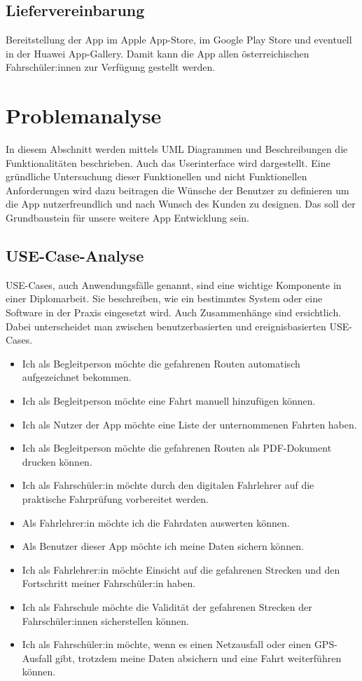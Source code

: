 \subsection{Liefervereinbarung}
Bereitstellung der App im Apple App-Store, im Google Play Store und eventuell in der Huawei App-Gallery. Damit kann die App allen österreichischen Fahrschüler:innen zur Verfügung gestellt werden.

\section{Problemanalyse}
\label{sec:problemanalyse}
In diesem Abschnitt werden mittels UML Diagrammen und Beschreibungen die Funktionalitäten beschrieben. Auch das Userinterface wird dargestellt. Eine gründliche Untersuchung dieser Funktionellen und nicht Funktionellen Anforderungen wird dazu beitragen die Wünsche der Benutzer zu definieren um die App nutzerfreundlich und nach Wunsch des Kunden zu designen. Das soll der Grundbaustein für unsere weitere App Entwicklung sein.

\subsection{USE-Case-Analyse}

USE-Cases, auch Anwendungsfälle genannt, sind eine wichtige Komponente in einer Diplomarbeit. Sie beschreiben, wie ein bestimmtes System oder eine Software in der Praxis eingesetzt wird. Auch Zusammenhänge sind ersichtlich. Dabei unterscheidet man zwischen benutzerbasierten und ereignisbasierten USE-Cases.

\begin{itemize}
	\item Ich als Begleitperson möchte die gefahrenen Routen automatisch aufgezeichnet bekommen.
	\item Ich als Begleitperson möchte eine Fahrt manuell hinzufügen können.
	\item Ich als Nutzer der App möchte eine Liste der unternommenen Fahrten haben.
	\item Ich als Begleitperson möchte die gefahrenen Routen als PDF-Dokument drucken können.
	\item Ich als Fahrschüler:in möchte durch den digitalen Fahrlehrer auf die praktische Fahrprüfung vorbereitet werden.
	\item Als Fahrlehrer:in möchte ich die Fahrdaten auswerten können.
	\item Als Benutzer dieser App möchte ich meine Daten sichern können.
	\item Ich als Fahrlehrer:in möchte Einsicht auf die gefahrenen Strecken und den Fortschritt meiner Fahrschüler:in haben.
	\item Ich als Fahrschule möchte die Validität der gefahrenen Strecken der Fahrschüler:innen sicherstellen können.
	\item Ich als Fahrschüler:in möchte, wenn es einen Netzausfall oder einen GPS-Ausfall gibt, trotzdem meine Daten absichern und eine Fahrt weiterführen können.
\end{itemize}


